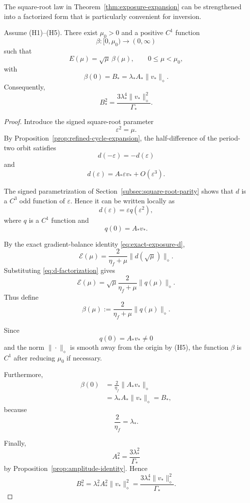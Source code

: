 The square-root law in
Theorem~\ref{thm:exposure-expansion} can be strengthened into a
factorized form that is particularly convenient for inversion.

\begin{lemma}
\label{lem:exposure-factorization}
Assume {\rm (H1)--(H5)}. There exist $\mu_0>0$ and a positive
$C^1$ function
\[
\beta:[0,\mu_0)\to(0,\infty)
\]
such that
\[
E(\mu)=\sqrt{\mu}\,\beta(\mu),
\qquad
0\leq\mu<\mu_0,
\]
with
\[
\beta(0)
=
B_*
=
\lambda_*A_*\|v_*\|_\diamond.
\]
Consequently,
\[
B_*^2
=
\frac{3\lambda_*^4\|v_*\|_\diamond^2}{\Gamma_*}.
\]
\end{lemma}

\begin{proof}
Introduce the signed square-root parameter
\[
\varepsilon^2=\mu.
\]
By Proposition~\ref{prop:refined-cycle-expansion}, the
half-difference of the period-two orbit satisfies
\[
d(-\varepsilon)=-d(\varepsilon)
\]
and
\[
d(\varepsilon)
=
A_*\varepsilon v_*
+
O(\varepsilon^3).
\]

The signed parametrization of
Section~\ref{subsec:square-root-parity} shows that $d$ is a $C^3$
odd function of $\varepsilon$.  Hence it can be written locally as
\begin{equation}
d(\varepsilon)
=
\varepsilon q(\varepsilon^2),
\label{eq:d-factorization}
\end{equation}
where $q$ is a $C^1$ function and
\begin{equation}
q(0)=A_*v_*.
\label{eq:q-zero}
\end{equation}

By the exact gradient-balance identity
\eqref{eq:exact-exposure-d},
\[
\mathscr E(\mu)
=
\frac{2}{\eta_f+\mu}
\|d(\sqrt{\mu})\|_\diamond.
\]
Substituting \eqref{eq:d-factorization} gives
\[
\mathscr E(\mu)
=
\sqrt{\mu}
\frac{2}{\eta_f+\mu}
\|q(\mu)\|_\diamond.
\]
Thus define
\begin{equation}
\beta(\mu)
:=
\frac{2}{\eta_f+\mu}
\|q(\mu)\|_\diamond.
\label{eq:beta-definition}
\end{equation}

Since
\[
q(0)=A_*v_*\neq0
\]
and the norm $\|\cdot\|_\diamond$ is smooth away from the
origin by {\rm (H5)}, the function $\beta$ is $C^1$ after
reducing $\mu_0$ if necessary.

Furthermore,
\begin{align}
\beta(0)
&=
\frac{2}{\eta_f}
\|A_*v_*\|_\diamond
\nonumber\\
&=
\lambda_*A_*\|v_*\|_\diamond
=
B_*,
\end{align}
because
\[
\frac{2}{\eta_f}=\lambda_*.
\]

Finally,
\[
A_*^2
=
\frac{3\lambda_*^2}{\Gamma_*}
\]
by Proposition~\ref{prop:amplitude-identity}. Hence
\[
B_*^2
=
\lambda_*^2A_*^2\|v_*\|_\diamond^2
=
\frac{
3\lambda_*^4\|v_*\|_\diamond^2
}{
\Gamma_*
}.
\]
\end{proof}

